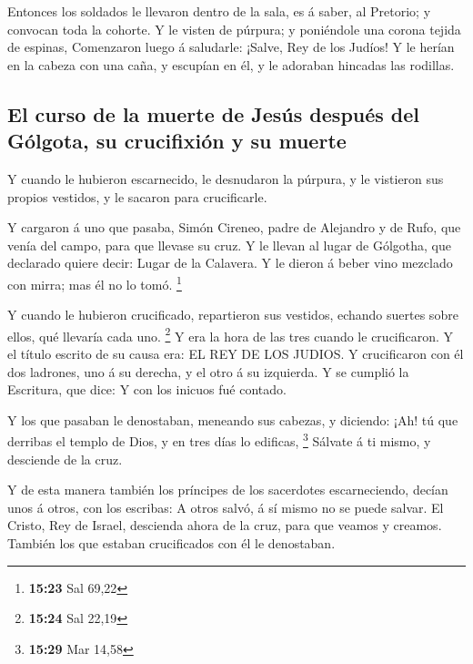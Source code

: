  Entonces los soldados le llevaron dentro de la sala, es á
saber, al Pretorio; y convocan toda la cohorte.  Y le
visten de púrpura; y poniéndole una corona tejida de espinas,
 Comenzaron luego á saludarle: ¡Salve, Rey de los Judíos!
 Y le herían en la cabeza con una caña, y escupían en él, y
le adoraban hincadas las rodillas.

\hypertarget{el-curso-de-la-muerte-de-jesuxfas-despuuxe9s-del-guxf3lgota-su-crucifixiuxf3n-y-su-muerte}{%
\subsection{El curso de la muerte de Jesús después del Gólgota, su
crucifixión y su
muerte}\label{el-curso-de-la-muerte-de-jesuxfas-despuuxe9s-del-guxf3lgota-su-crucifixiuxf3n-y-su-muerte}}

 Y cuando le hubieron escarnecido, le desnudaron la
púrpura, y le vistieron sus propios vestidos, y le sacaron para
crucificarle.

 Y cargaron á uno que pasaba, Simón Cireneo, padre de
Alejandro y de Rufo, que venía del campo, para que llevase su cruz.
 Y le llevan al lugar de Gólgotha, que declarado quiere
decir: Lugar de la Calavera.  Y le dieron á beber vino
mezclado con mirra; mas él no lo tomó. \footnote{\textbf{15:23} Sal
  69,22}

 Y cuando le hubieron crucificado, repartieron sus
vestidos, echando suertes sobre ellos, qué llevaría cada uno.
\footnote{\textbf{15:24} Sal 22,19}  Y era la hora de las
tres cuando le crucificaron.  Y el título escrito de su
causa era: EL REY DE LOS JUDIOS.  Y crucificaron con él dos
ladrones, uno á su derecha, y el otro á su izquierda.  Y se
cumplió la Escritura, que dice: Y con los inicuos fué contado.

 Y los que pasaban le denostaban, meneando sus cabezas, y
diciendo: ¡Ah! tú que derribas el templo de Dios, y en tres días lo
edificas, \footnote{\textbf{15:29} Mar 14,58}  Sálvate á ti
mismo, y desciende de la cruz.

 Y de esta manera también los príncipes de los sacerdotes
escarneciendo, decían unos á otros, con los escribas: A otros salvó, á
sí mismo no se puede salvar.  El Cristo, Rey de Israel,
descienda ahora de la cruz, para que veamos y creamos. También los que
estaban crucificados con él le denostaban.

